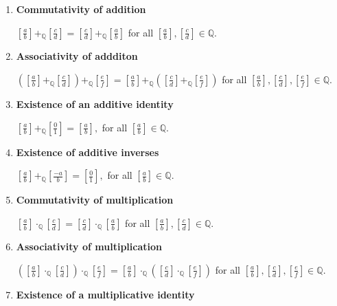 \documentclass[11pt]{article}
\begin{document}
\begin{theorem}[2.9]

\begin{enumerate}
\item[a)] {\bf Commutativity of addition}

$\displaystyle \left[\frac{a}{b}\right]+_{\mathbb{Q}} \left[\frac{c}{d}\right] =\left[\frac{c}{d}\right]+_{\mathbb{Q}}\left[\frac{a}{b}\right]$ for all $\displaystyle  \left[\frac{a}{b}\right],\left[\frac{c}{d}\right] \in\mathbb{Q}.$
\item[b)] {\bf Associativity of addditon}

$\displaystyle \left(\left[\frac{a}{b}\right]+_{\mathbb{Q}}\left[\frac{c}{d}\right] \right)+_{\mathbb{Q}}\left[\frac{e}{f}\right] = 
\left[\frac{a}{b}\right]+_{\mathbb{Q}}\left( \left[\frac{c}{d}\right] +_{\mathbb{Q}} \left[\frac{e}{f}\right]\right) $ for all $\displaystyle \left[\frac{a}{b}\right],\left[\frac{c}{d}\right] , \left[\frac{e}{f}\right]\in \mathbb{Q}.$
\item[c)] {\bf Existence of an additive identity}

$\displaystyle \left[\frac{a}{b}\right]+_{\mathbb{Q}}\left[\frac{0}{1}\right]=\left[\frac{a}{b}\right],$ for all $\displaystyle \left[\frac{a}{b}\right]\in\mathbb{Q}.$
\item[d)] {\bf Existence of additive inverses}

$\displaystyle \left[\frac{a}{b}\right]+_{\mathbb{Q}}\left[\frac{-a}{b}\right]=\left[\frac{0}{1}\right],$ for all $\displaystyle \left[\frac{a}{b}\right] \in \mathbb{Q}.$

\item[e)] {\bf Commutativity of multiplication}

$\displaystyle \left[\frac{a}{b}\right]\cdot_{\mathbb{Q}} \left[\frac{c}{d}\right] =\left[\frac{c}{d}\right]\cdot_{\mathbb{Q}} \left[\frac{a}{b}\right]$ for all $\displaystyle  \left[\frac{a}{b}\right],\left[\frac{c}{d}\right] \in\mathbb{Q}.$
\item[f)] {\bf Associativity of multiplication}

$\displaystyle \left(\left[\frac{a}{b}\right]\cdot_{\mathbb{Q}} \left[\frac{c}{d}\right] \right)\cdot_{\mathbb{Q}} \left[\frac{e}{f}\right] = 
\left[\frac{a}{b}\right]\cdot_{\mathbb{Q}} \left( \left[\frac{c}{d}\right] \cdot_{\mathbb{Q}} \left[\frac{e}{f}\right]\right) $ for all $\displaystyle \left[\frac{a}{b}\right],\left[\frac{c}{d}\right] , \left[\frac{e}{f}\right]\in \mathbb{Q}.$

\item[g)]  {\bf Existence of a multiplicative identity}


\end{enumerate}
\end{theorem}
\end{document}
